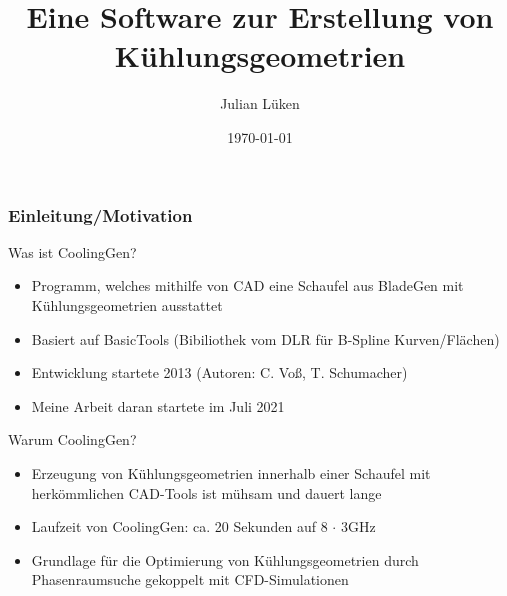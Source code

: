 \documentclass[8pt, aspectratio=169]{beamer}
\title[CoolingGen]{Eine Software zur Erstellung von Kühlungsgeometrien}
\author{Julian Lüken}
\date{\today}
\begin{document}
\begin{frame}[plain]
	\maketitle
\end{frame}

\begin{frame}
	\frametitle{Einleitung/Motivation}
	\vspace{-1cm}\hspace{-0.5cm}
	\begin{minipage}[t]{\textwidth}
		Was ist CoolingGen?
		\begin{itemize}
			\item Programm, welches mithilfe von CAD eine Schaufel aus BladeGen mit Kühlungsgeometrien ausstattet
			\item Basiert auf BasicTools (Bibiliothek vom DLR für B-Spline Kurven/Flächen)
			\item Entwicklung startete 2013 (Autoren: C. Voß, T. Schumacher)
			\item Meine Arbeit daran startete im Juli 2021
		\end{itemize}
		\vspace{0.5cm}
		Warum CoolingGen?
		\begin{itemize}
			\item Erzeugung von Kühlungsgeometrien innerhalb einer Schaufel mit herkömmlichen CAD-Tools ist mühsam und dauert lange
			\item Laufzeit von CoolingGen: ca. 20 Sekunden auf 8 $\cdot$ 3GHz
			\item Grundlage für die Optimierung von Kühlungsgeometrien durch Phasenraumsuche gekoppelt mit CFD-Simulationen
		\end{itemize}

	\end{minipage}
	\vfill
\end{frame}
\end{document}
